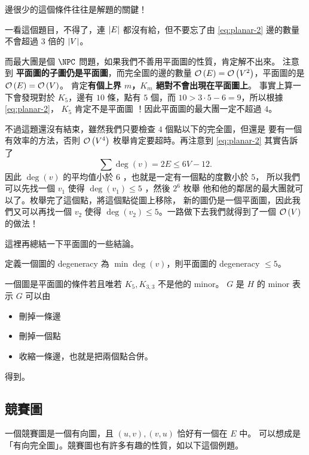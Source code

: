 \documentclass[a4paper,12pt]{book}
\begin{document}
邊很少的這個條件往往是解題的關鍵！

一看這個題目，不得了，連 $\lvert E \rvert$ 都沒有給，但不要忘了由 \eqref{eq:planar-2}
邊的數量不會超過 $3$ 倍的 $\lvert V \rvert$。 

而最大團是個 $\NPC$ 問題，如果我們不善用平面圖的性質，肯定解不出來。
注意到 {\bf 平面圖的子圖仍是平面圖}，而完全圖的邊的數量 
$\operatorname{\mathcal{O}}\left(E\right) = \operatorname{\mathcal{O}}\left(V^2\right)$，平面圖的是 $\operatorname{\mathcal{O}}\left(E\right) = \operatorname{\mathcal{O}}\left(V\right)$。
肯定{\bf 有個上界 $m$，$K_m$ 絕對不會出現在平面圖上}。
事實上算一下會發現對於 $K_5$，邊有 $10$ 條，點有 $5$ 個，而
$10 > 3 \cdot 5 - 6 = 9$，所以根據 \eqref{eq:planar-2}， $K_5$ 肯定不是平面圖
！因此平面圖的最大團一定不超過 $4$。

不過這題還沒有結束，雖然我們只要檢查 $4$ 個點以下的完全圖，但還是
要有一個有效率的方法，否則 $\operatorname{\mathcal{O}}\left(V^4\right)$ 枚舉肯定要超時。再注意到
\eqref{eq:planar-2} 其實告訴了
\[ \sum \deg(v) = 2E \leq 6V - 12.\]
因此 $\deg(v)$ 的平均值小於 $6$ ，也就是一定有一個點的度數小於 $5$，
所以我們可以先找一個 $v_1$ 使得 $\deg(v_1) \leq 5$ ，然後 $2^6$ 枚舉
他和他的鄰居的最大團就可以了。枚舉完了這個點，將這個點從圖上移除，
新的圖仍是一個平面圖，因此我們又可以再找一個 $v_2$ 使得
$\deg(v_2) \leq 5$。一路做下去我們就得到了一個 $\operatorname{\mathcal{O}}\left(V\right)$ 的做法！

這裡再總結一下平面圖的一些結論。

\begin{theorem}[定理]
  定義一個圖的 degeneracy 為 $\min \deg(v)$，則平面圖的 degeneracy $\leq 5$。
\end{theorem}

\begin{theorem}[定理]
  一個圖是平面圖的條件若且唯若 $K_5, K_{3, 3}$ 不是他的 minor。
  $G$ 是 $H$ 的 minor 表示 $G$ 可以由
  \begin{itemize}
    \item 刪掉一條邊
    \item 刪掉一個點
    \item 收縮一條邊，也就是把兩個點合併。
  \end{itemize}
  得到。
\end{theorem}

\subsection{競賽圖}
一個競賽圖是一個有向圖，且 $(u, v), (v, u)$ 恰好有一個在 $E$ 中。
可以想成是「有向完全圖」。競賽圖也有許多有趣的性質，如以下這個例題。
\end{document}
